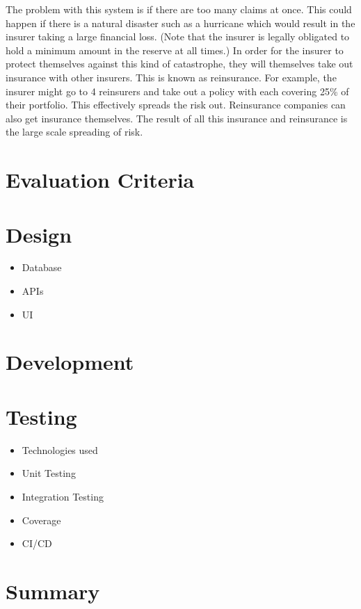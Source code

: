 \documentclass[12pt]{article}
\begin{document}
The problem with this system is if there are too many claims at once. This could happen if there is a natural disaster such as a hurricane which would result in the insurer taking a large financial loss. (Note that the insurer is legally obligated to hold a minimum amount in the reserve at all times.) In order for the insurer to protect themselves against this kind of catastrophe, they will themselves take out insurance with other insurers. This is known as reinsurance. For example, the insurer might go to 4 reinsurers and take out a policy with each covering 25\% of their portfolio. This effectively spreads the risk out. Reinsurance companies can also get insurance themselves. The result of all this insurance and reinsurance is the large scale spreading of risk.
\section{Evaluation Criteria}
\section{Design}
\begin{itemize}
    \item Database
    \item APIs
    \item UI
\end{itemize}
\section{Development}
\section{Testing}
\begin{itemize}
    \item Technologies used
    \item Unit Testing
    \item Integration Testing
    \item Coverage
    \item CI/CD
\end{itemize}
\section{Summary}



\end{document}
